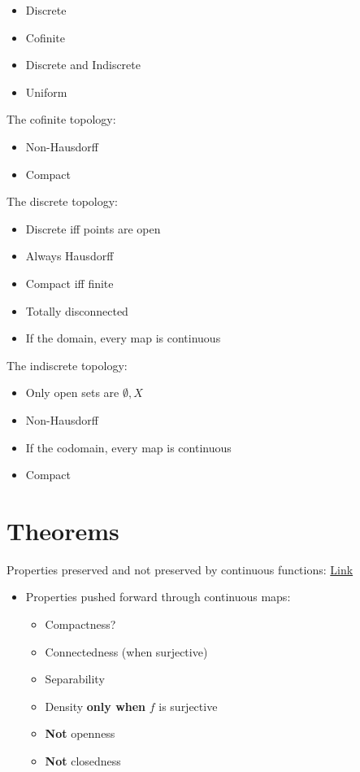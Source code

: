 \begin{itemize}
\tightlist
\item
  Discrete
\item
  Cofinite
\item
  Discrete and Indiscrete
\item
  Uniform
\end{itemize}

The cofinite topology:

\begin{itemize}
\tightlist
\item
  Non-Hausdorff
\item
  Compact
\end{itemize}

The discrete topology:

\begin{itemize}
\tightlist
\item
  Discrete iff points are open
\item
  Always Hausdorff
\item
  Compact iff finite
\item
  Totally disconnected
\item
  If the domain, every map is continuous
\end{itemize}

The indiscrete topology:

\begin{itemize}
\tightlist
\item
  Only open sets are \(\emptyset, X\)
\item
  Non-Hausdorff
\item
  If the codomain, every map is continuous
\item
  Compact
\end{itemize}

\hypertarget{theorems}{%
\section{Theorems}\label{theorems}}

Properties preserved and not preserved by continuous functions:
\href{https://people.clas.ufl.edu/groisser/files/cont_img_preimg.pdf}{Link}

\begin{itemize}
\tightlist
\item
  Properties pushed forward through continuous maps:

  \begin{itemize}
  \tightlist
  \item
    Compactness?
  \item
    Connectedness (when surjective)
  \item
    Separability
  \item
    Density \textbf{only when} \(f\) is surjective
  \item
    \textbf{Not} openness
  \item
    \textbf{Not} closedness
  \end{itemize}
\end{itemize}

